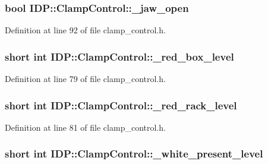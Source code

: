 \hypertarget{classIDP_1_1ClampControl_a07bfb23f284fb25dacd0d22e5f218375}{
\subsubsection[{\_\-jaw\_\-open}]{\setlength{\rightskip}{0pt plus 5cm}bool {\bf IDP::ClampControl::\_\-jaw\_\-open}}}
\label{classIDP_1_1ClampControl_a07bfb23f284fb25dacd0d22e5f218375}


Definition at line 92 of file clamp\_\-control.h.

\hypertarget{classIDP_1_1ClampControl_ad6188d015d2f9f237abc81574715f6f6}{
\subsubsection[{\_\-red\_\-box\_\-level}]{\setlength{\rightskip}{0pt plus 5cm}short int {\bf IDP::ClampControl::\_\-red\_\-box\_\-level}}}
\label{classIDP_1_1ClampControl_ad6188d015d2f9f237abc81574715f6f6}


Definition at line 79 of file clamp\_\-control.h.

\hypertarget{classIDP_1_1ClampControl_ac9d8d3c77082aa750ddb98b32596f636}{
\subsubsection[{\_\-red\_\-rack\_\-level}]{\setlength{\rightskip}{0pt plus 5cm}short int {\bf IDP::ClampControl::\_\-red\_\-rack\_\-level}}}
\label{classIDP_1_1ClampControl_ac9d8d3c77082aa750ddb98b32596f636}


Definition at line 81 of file clamp\_\-control.h.

\hypertarget{classIDP_1_1ClampControl_a1576dda5ebbae90e0861fa0212e5d743}{
\subsubsection[{\_\-white\_\-present\_\-level}]{\setlength{\rightskip}{0pt plus 5cm}short int {\bf IDP::ClampControl::\_\-white\_\-present\_\-level}}}
\label{classIDP_1_1ClampControl_a1576dda5ebbae90e0861fa0212e5d743}


